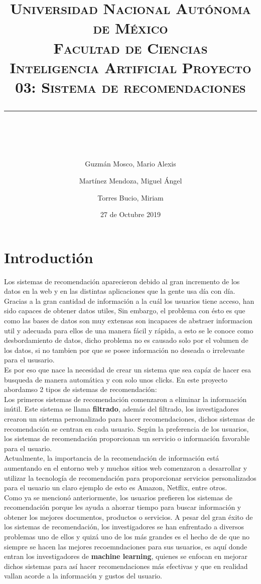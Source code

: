 \documentclass[10pt, a4paper]{article}
\title{\begin{center}
 {\LARGE \scshape Universidad Nacional Aut\'onoma de M\'exico \\ Facultad de Ciencias \\ Inteligencia Artificial Proyecto 03: Sistema de recomendaciones }
  \rule{1\textwidth}{2.0pt}\\
\end{center}}
\author{
  Guzmán Mosco, Mario Alexis\\
  \and  
  Mart\'inez Mendoza, Miguel \'Angel\\
  \and
  Torres Bucio, Miriam\\
}
\date{27 de Octubre 2019}
\begin{document}
\maketitle

\section{Introducti\'on}
Los sistemas de recomendaci\'on aparecieron debido al gran incremento de los datos en la web y en las distintas aplicaciones que la gente usa d\'ia con d\'ia. Gracias a la gran cantidad de informaci\'on a la cu\'al los usuarios tiene acceso, han sido capaces de obtener datos utiles, Sin embargo, el problema con \'esto es que como las bases de datos son muy extensas son incapaces de abstraer informacion util y adecuada para ellos de una manera f\'acil y r\'apida, a esto se le conoce como desbordamiento de datos, dicho problema no es causado solo por el volumen de los datos, si no tambien por que se posee informaci\'on no deseada o irrelevante para el ususario.\\
Es por eso que nace la necesidad de crear un sistema que sea cap\'az de hacer esa busqueda de manera autom\'atica y con solo unos clicks.
En este proyecto abordamso 2 tipos de sistemas de recomendaci\'on: \\
Los primeros sistemas de recomendación comenzaron a eliminar la información inútil. Este sistema se llama \textbf{filtrado}, además del filtrado, los investigadores crearon un sistema personalizado para hacer recomendaciones, dichos sistemas de recomendación se centran en cada usuario. Según la preferencia de los usuarios, los sistemas de recomendación proporcionan un servicio o información favorable para el usuario.\\ Actualmente, la importancia de la recomendación de información está aumentando en el entorno web y muchos sitios web comenzaron a desarrollar y utilizar la tecnología de recomendación para proporcionar servicios personalizados para el usuario un claro ejemplo de esto es Amazon, Netflix, entre otros.\\
Como ya se mencion\'o anteriormente, los usuarios prefieren los sistemas de recomendación porque les ayuda a ahorrar tiempo para buscar información y obtener los mejores documentos, productos o servicios. A pesar del gran \'exito de los sistemas de recomendaci\'on, los investigadores se han enfrentado a diversos problemas uno de ellos y quiz\'a uno de los m\'as grandes es el hecho de de que no siempre se hacen las mejores recoemndaciones para sus usuarios, es aqu\'i donde entran los investigadores de \textbf{machine learning}, quienes se enfocan en mejorar dichos sistemas para as\'i hacer recomendaciones m\'as efectivas y que en realidad vallan acorde a la informaci\'on y gustos del usuario.\\  
\end{document}
